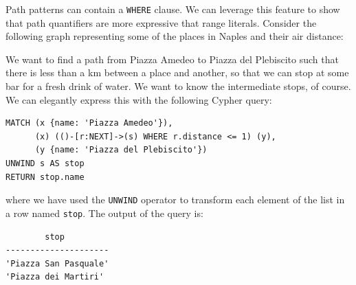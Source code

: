 \begin{example}{}
    Path patterns can contain a \texttt{WHERE} clause. We can leverage this feature to show that path quantifiers are more expressive that range literals.
    Consider the following graph representing some of the places in Naples and their air distance:
\begin{center}
\end{center}

    We want to find a path from Piazza Amedeo to Piazza del Plebiscito such that there is less than a km between a place and another, so that we can stop at some bar for a fresh drink of water. We want to know the intermediate stops, of course.
    We can elegantly express this with the following Cypher query:
    \begin{lstlisting}
MATCH (x {name: 'Piazza Amedeo'}),
      (x) (()-[r:NEXT]->(s) WHERE r.distance <= 1) (y),
      (y {name: 'Piazza del Plebiscito'})
UNWIND s AS stop
RETURN stop.name
    \end{lstlisting}
    where we have used the \texttt{UNWIND} operator to transform each element of the  list in a row named \texttt{stop}.
    The output of the query is:
    \begin{lstlisting}
        stop
---------------------
'Piazza San Pasquale'
'Piazza dei Martiri'
    \end{lstlisting}
\end{example}

